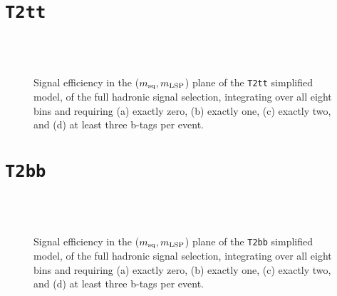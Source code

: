 \newpage
\section{\texttt{T2tt}\label{app:sig-eff-t2tt}}

\begin{figure}[h!]
  \begin{center}
     \\
     \\
    \caption{\label{fig:sig-eff-t2tt}Signal efficiency in the ($m_{\rm
        sq},m_{\rm LSP}$) plane of the \texttt{T2tt} simplified model,
      of the full hadronic signal selection, integrating over all
      eight \HT bins and requiring (a) exactly zero, (b) exactly
      one, (c) exactly two, and (d) at least three b-tags per event.}
  \end{center}
\end{figure}

\newpage
\section{\texttt{T2bb}\label{app:sig-eff-t2bb}}

\begin{figure}[h!]
  \begin{center}
     \\
     \\
    \caption{\label{fig:sig-eff-t2bb}Signal efficiency in the ($m_{\rm
        sq},m_{\rm LSP}$) plane of the \texttt{T2bb} simplified model,
      of the full hadronic signal selection, integrating over all
      eight \HT bins and requiring (a) exactly zero, (b) exactly
      one, (c) exactly two, and (d) at least three b-tags per event.}
  \end{center}
\end{figure}


